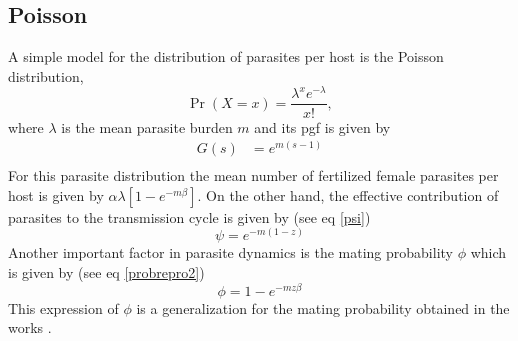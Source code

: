 \documentclass[bimj,fleqn]{w-art}
\theoremstyle{plain}
\theoremstyle{definition}
\begin{document}
\subsection{Poisson}
A simple model for the distribution of parasites per host \cite{lahmar2001frequency} is the Poisson distribution,
\begin{equation}
\Pr(X=x)=\frac {\lambda ^{x}e^{-\lambda }}{x!},
\end{equation}     
where $\lambda$ is the mean parasite burden $m$ and its pgf is given by
\begin{equation}
\begin{split}
G(s)&=e^{m(s-1)}\\
\end{split}
\end{equation}
For this parasite distribution the 
mean number of fertilized female parasites per host is given by
$\alpha \lambda \left[1  -  e^{-m\beta} \right]$.
On the other hand, the effective contribution of parasites to the transmission cycle is given by (see eq \eqref{psi})
%
\begin{equation}
\psi=e^{-m(1-z)}
\end{equation}
Another important factor in parasite dynamics is the mating probability $\phi$ which is given by (see eq \eqref{probrepro2})
%
\begin{equation}
\phi=
1-e^{-mz \beta}
\end{equation}
This expression of $\phi$ is a generalization for the  mating probability obtained in the works \cite{anderson1992infectious,may1993biased,may1977togetherness}. 

\end{document}
